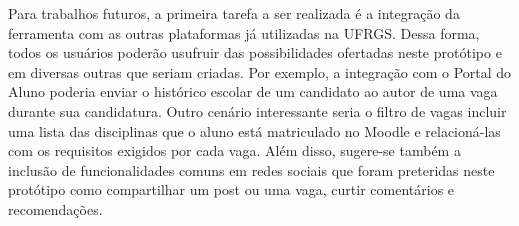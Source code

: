 Para trabalhos futuros, a primeira tarefa a ser realizada é a integração da ferramenta com as outras plataformas já utilizadas na UFRGS. Dessa forma, todos os usuários poderão usufruir das possibilidades ofertadas neste protótipo e em diversas outras que seriam criadas. Por exemplo, a integração com o Portal do Aluno poderia enviar o histórico escolar de um candidato ao autor de uma vaga durante sua candidatura. Outro cenário interessante seria o filtro de vagas incluir uma lista das disciplinas que o aluno está matriculado no Moodle e relacioná-las com os requisitos exigidos por cada vaga. Além disso, sugere-se também a inclusão de funcionalidades comuns em redes sociais que foram preteridas neste protótipo como compartilhar um post ou uma vaga, curtir comentários e recomendações.